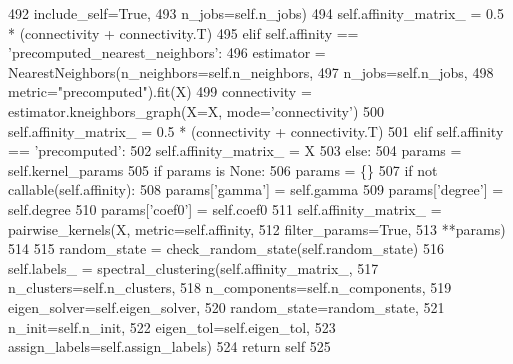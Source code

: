 \begin{DoxyCode}
492                                             include\_self=\textcolor{keyword}{True},
493                                             n\_jobs=self.n\_jobs)
494             self.affinity\_matrix\_ = 0.5 * (connectivity + connectivity.T)
495         \textcolor{keywordflow}{elif} self.affinity == \textcolor{stringliteral}{'precomputed\_nearest\_neighbors'}:
496             estimator = NearestNeighbors(n\_neighbors=self.n\_neighbors,
497                                          n\_jobs=self.n\_jobs,
498                                          metric=\textcolor{stringliteral}{"precomputed"}).fit(X)
499             connectivity = estimator.kneighbors\_graph(X=X, mode=\textcolor{stringliteral}{'connectivity'})
500             self.affinity\_matrix\_ = 0.5 * (connectivity + connectivity.T)
501         \textcolor{keywordflow}{elif} self.affinity == \textcolor{stringliteral}{'precomputed'}:
502             self.affinity\_matrix\_ = X
503         \textcolor{keywordflow}{else}:
504             params = self.kernel\_params
505             \textcolor{keywordflow}{if} params \textcolor{keywordflow}{is} \textcolor{keywordtype}{None}:
506                 params = \{\}
507             \textcolor{keywordflow}{if} \textcolor{keywordflow}{not} callable(self.affinity):
508                 params[\textcolor{stringliteral}{'gamma'}] = self.gamma
509                 params[\textcolor{stringliteral}{'degree'}] = self.degree
510                 params[\textcolor{stringliteral}{'coef0'}] = self.coef0
511             self.affinity\_matrix\_ = pairwise\_kernels(X, metric=self.affinity,
512                                                      filter\_params=\textcolor{keyword}{True},
513                                                      **params)
514 
515         random\_state = check\_random\_state(self.random\_state)
516         self.labels\_ = spectral\_clustering(self.affinity\_matrix\_,
517                                            n\_clusters=self.n\_clusters,
518                                            n\_components=self.n\_components,
519                                            eigen\_solver=self.eigen\_solver,
520                                            random\_state=random\_state,
521                                            n\_init=self.n\_init,
522                                            eigen\_tol=self.eigen\_tol,
523                                            assign\_labels=self.assign\_labels)
524         \textcolor{keywordflow}{return} self
525 
\end{DoxyCode}
\mbox{\label{classdsmacc_1_1examples_1_1__spectral_1_1SpectralClustering_a2199033bd2458f93914ca1a1ad26ca23}} 

